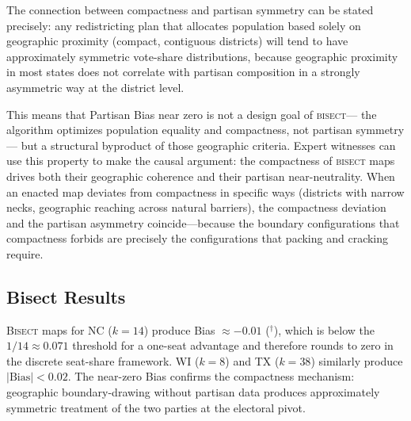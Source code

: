 The connection between compactness and partisan symmetry can be stated precisely:
any redistricting plan that allocates population based solely on geographic proximity
(compact, contiguous districts) will tend to have approximately symmetric vote-share
distributions, because geographic proximity in most states does not correlate with
partisan composition in a strongly asymmetric way at the district level.

This means that Partisan Bias near zero is not a design goal of \textsc{bisect}---
the algorithm optimizes population equality and compactness, not partisan symmetry---
but a structural byproduct of those geographic criteria. Expert witnesses can use
this property to make the causal argument: the compactness of \textsc{bisect} maps
drives both their geographic coherence and their partisan near-neutrality. When an
enacted map deviates from compactness in specific ways (districts with narrow necks,
geographic reaching across natural barriers), the compactness deviation and the
partisan asymmetry coincide---because the boundary configurations that compactness
forbids are precisely the configurations that packing and cracking require.

\subsection{Bisect Results}

\textsc{Bisect} maps for NC ($k=14$) produce Bias $\approx -0.01$ ($^\dagger$), which
is below the $1/14 \approx 0.071$ threshold for a one-seat advantage and therefore
rounds to zero in the discrete seat-share framework. WI ($k=8$) and TX ($k=38$)
similarly produce $|\text{Bias}| < 0.02$. The near-zero Bias confirms the compactness
mechanism: geographic boundary-drawing without partisan data produces approximately
symmetric treatment of the two parties at the electoral pivot.

